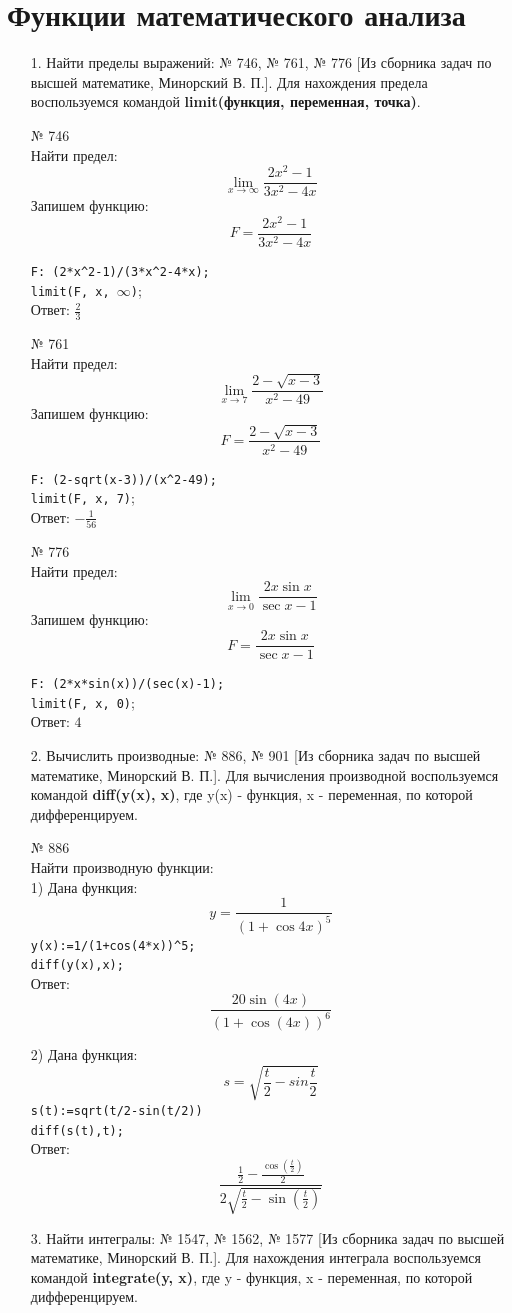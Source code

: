 \documentclass[article, bachelor, och, pract]{SCWorks}
\begin{document}
\section{Функции математического анализа}
\begin{itemize}
\item[1.] Найти пределы выражений: № 746, № 761, № 776 [Из сборника задач по высшей математике, Минорский В. П.]. Для нахождения предела воспользуемся командой \textbf{limit(функция, переменная, точка)}.

№ 746\\
Найти предел:
$$\lim_{x \to \infty}\frac{2x^2-1}{3x^2-4x}$$
Запишем функцию:
$$F=\frac{2x^2-1}{3x^2-4x}$$

\texttt{F: (2*x\^{}2-1)/(3*x\^{}2-4*x);}\\
\texttt{limit(F, x, $\infty$)}; \\ 
Ответ: $\frac{2}{3}$

№ 761\\
Найти предел:
$$\lim_{x \to 7}\frac{2-\sqrt{x-3}}{x^2-49}$$
Запишем функцию:
$$F=\frac{2-\sqrt{x-3}}{x^2-49}$$

\texttt{F: (2-sqrt(x-3))/(x\^{}2-49);}\\
\texttt{limit(F, x, 7)}; \\ 
Ответ: $-\frac{1}{56}$

№ 776\\
Найти предел:
$$\lim_{x \to 0}\frac{2x\sin{x}}{\sec{x}-1}$$
Запишем функцию:
$$F=\frac{2x\sin{x}}{\sec{x}-1}$$

\texttt{F: (2*x*sin(x))/(sec(x)-1);}\\
\texttt{limit(F, x, 0)}; \\ 
Ответ: $4$

\item[2.] Вычислить производные: № 886, № 901 [Из сборника задач по высшей математике, Минорский В. П.]. Для вычисления производной воспользуемся командой \textbf{diff(y(x), x)}, где y(x) - функция, x - переменная, по которой дифференцируем.

№ 886\\
Найти производную функции:\\
1) Дана функция: $$ y = \frac{1}{(1+\cos{4x})^5} $$
\texttt{y(x):=1/(1+cos(4*x))\^{}5;}\\
\texttt{diff(y(x),x);}\\
Ответ: \[\frac{20\sin{(4x)}}{{{\left( 1+\cos{(4x)}\right) }^{6}}}\]


2) Дана функция: $$ s = \sqrt{\frac{t}{2} - sin{\frac{t}{2}}} $$
\texttt{s(t):=sqrt(t/2-sin(t/2))}\\
\texttt{diff(s(t),t);}\\
Ответ:
\[\frac{\frac{1}{2}-\frac{\cos{\left( \frac{t}{2}\right) }}{2}}{2\sqrt{\frac{t}{2}-\sin{\left( \frac{t}{2}\right) }}}\]
\item[3.] Найти интегралы: № 1547, № 1562, № 1577 [Из сборника задач по высшей математике, Минорский В. П.]. Для нахождения интеграла воспользуемся командой \textbf{integrate(y, x)}, где y - функция, x - переменная, по которой дифференцируем.


\end{itemize}
\end{document}
